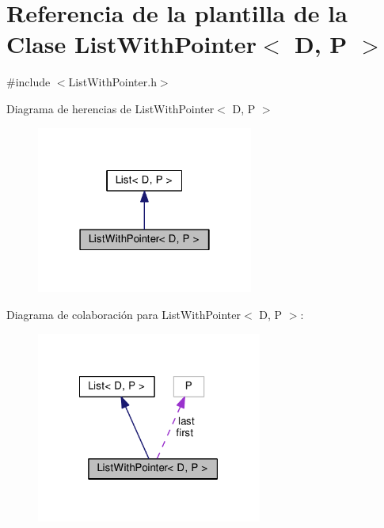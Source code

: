 \hypertarget{class_list_with_pointer}{\section{Referencia de la plantilla de la Clase List\-With\-Pointer$<$ D, P $>$}
\label{class_list_with_pointer}
}


{\ttfamily \#include $<$List\-With\-Pointer.\-h$>$}



Diagrama de herencias de List\-With\-Pointer$<$ D, P $>$\nopagebreak
\begin{figure}[H]
\begin{center}
\leavevmode
\includegraphics[width=202pt]{class_list_with_pointer__inherit__graph}
\end{center}
\end{figure}


Diagrama de colaboración para List\-With\-Pointer$<$ D, P $>$\-:\nopagebreak
\begin{figure}[H]
\begin{center}
\leavevmode
\includegraphics[width=210pt]{class_list_with_pointer__coll__graph}
\end{center}
\end{figure}
